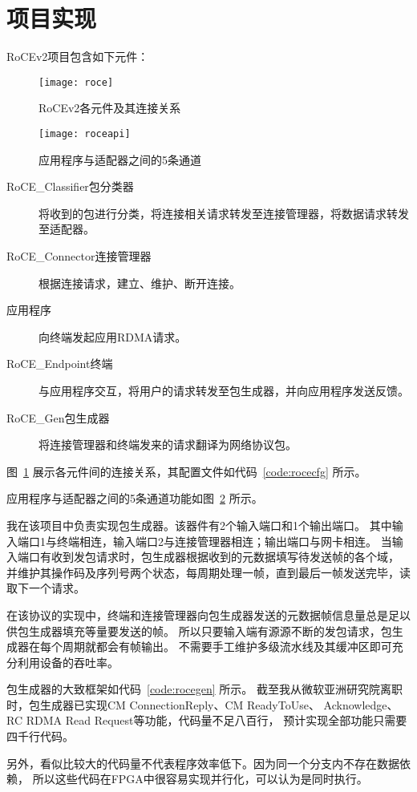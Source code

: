 \section{项目实现}
RoCEv2项目包含如下元件：
\begin{figure}[htbp]
\centering
\texttt{[image: roce]}
\caption{RoCEv2各元件及其连接关系}\label{fig:roce}
\end{figure}



\begin{figure}[htbp]
\centering
\texttt{[image: roceapi]}
\caption{应用程序与适配器之间的5条通道}\label{fig:roceapi}
\end{figure}

\begin{description}
\item[RoCE\_Classifier包分类器]将收到的包进行分类，将连接相关请求转发至连接管理器，将数据请求转发至适配器。
\item[RoCE\_Connector连接管理器]根据连接请求，建立、维护、断开连接。
\item[应用程序]向终端发起应用RDMA请求。
\item[RoCE\_Endpoint终端]与应用程序交互，将用户的请求转发至包生成器，并向应用程序发送反馈。
\item[RoCE\_Gen包生成器]将连接管理器和终端发来的请求翻译为网络协议包。
\end{description}

图~\ref{fig:roce} 展示各元件间的连接关系，其配置文件如代码~\ref{code:rocecfg} 所示。

应用程序与适配器之间的5条通道功能如图~\ref{fig:roceapi} 所示。

我在该项目中负责实现包生成器。该器件有2个输入端口和1个输出端口。
其中输入端口1与终端相连，输入端口2与连接管理器相连；输出端口与网卡相连。
当输入端口有收到发包请求时，包生成器根据收到的元数据填写待发送帧的各个域，
并维护其操作码及序列号两个状态，每周期处理一帧，直到最后一帧发送完毕，读取下一个请求。

在该协议的实现中，终端和连接管理器向包生成器发送的元数据帧信息量总是足以供包生成器填充等量要发送的帧。
所以只要输入端有源源不断的发包请求，包生成器在每个周期就都会有帧输出。
不需要手工维护多级流水线及其缓冲区即可充分利用设备的吞吐率。

包生成器的大致框架如代码~\ref{code:rocegen} 所示。
截至我从微软亚洲研究院离职时，包生成器已实现CM ConnectionReply、CM ReadyToUse、
Acknowledge、RC RDMA Read Request等功能，代码量不足八百行，
预计实现全部功能只需要四千行代码。

另外，看似比较大的代码量不代表程序效率低下。因为同一个分支内不存在数据依赖，
所以这些代码在FPGA中很容易实现并行化，可以认为是同时执行。

\newpage

